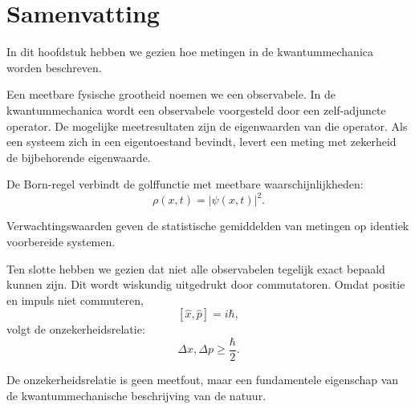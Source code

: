 \documentclass{report} %
\begin{document}
    \section{Samenvatting}

    In dit hoofdstuk hebben we gezien hoe metingen in de kwantummechanica worden beschreven.

    Een meetbare fysische grootheid noemen we een observabele. In de kwantummechanica wordt een observabele voorgesteld door een zelf-adjuncte operator. De mogelijke meetresultaten zijn de eigenwaarden van die operator. Als een systeem zich in een eigentoestand bevindt, levert een meting met zekerheid de bijbehorende eigenwaarde.

    De Born-regel verbindt de golffunctie met meetbare waarschijnlijkheden:
    \[
        \rho(x,t)=|\psi(x,t)|^2.
    \]

    Verwachtingswaarden geven de statistische gemiddelden van metingen op identiek voorbereide systemen.

    Ten slotte hebben we gezien dat niet alle observabelen tegelijk exact bepaald kunnen zijn. Dit wordt wiskundig uitgedrukt door commutatoren. Omdat positie en impuls niet commuteren,
    \[
        [\hat{x},\hat{p}]=i\hbar,
    \]
    volgt de onzekerheidsrelatie:
    \[
        \Delta x,\Delta p\geq\frac{\hbar}{2}.
    \]

    De onzekerheidsrelatie is geen meetfout, maar een fundamentele eigenschap van de kwantummechanische beschrijving van de natuur.
\end{document}
